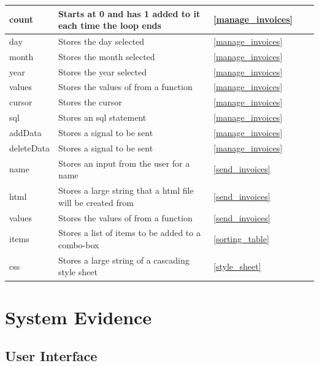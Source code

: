\begin{center}
\begin{longtable}{|p{2cm}|p{2cm}|p{2cm}|p{2cm}|l}
		count & Starts at 0 and has 1 added to it each time the loop ends & \ref{manage_invoices} & \\ \hline
		day & Stores the day selected & \ref{manage_invoices} & \\ \hline
		month & Stores the month selected & \ref{manage_invoices} & \\ \hline
		year & Stores the year selected & \ref{manage_invoices} & \\ \hline
		values & Stores the values of from a function & \ref{manage_invoices} & \\ \hline
		cursor & Stores the cursor & \ref{manage_invoices} & \\ \hline
		sql & Stores an sql statement & \ref{manage_invoices} & \\ \hline
		addData & Stores a signal to be sent  & \ref{manage_invoices} & \\ \hline
		deleteData & Stores a signal to be sent  & \ref{manage_invoices} & \\ \hline
		name & Stores an input from the user for a name & \ref{send_invoices} & \\ \hline
		html & Stores a large string that a html file will be created from & \ref{send_invoices} & \\ \hline
		values & Stores the values of from a function & \ref{send_invoices} & \\ \hline
		items & Stores a list of items to be added to a combo-box & \ref{sorting_table} & \\ \hline
		css & Stores a large string of a cascading style sheet & \ref{style_sheet} & \\ \hline
	\end{longtable}
\end{center}




\section{System Evidence}

\subsection{User Interface}

